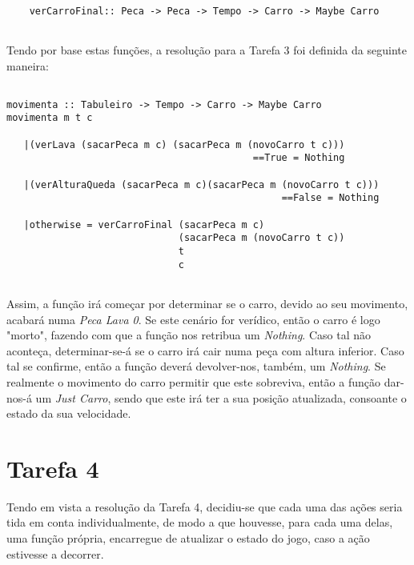 \documentclass[a4paper]{report} %
\begin{document}
  \begin{verbatim}
      
    verCarroFinal:: Peca -> Peca -> Tempo -> Carro -> Maybe Carro
    
  \end{verbatim}

  \par Tendo por base estas funções, a resolução para a Tarefa 3 foi definida da seguinte maneira:

  \begin{verbatim}
    
movimenta :: Tabuleiro -> Tempo -> Carro -> Maybe Carro
movimenta m t c 
   
   |(verLava (sacarPeca m c) (sacarPeca m (novoCarro t c)))
                                           ==True = Nothing 
   
   |(verAlturaQueda (sacarPeca m c)(sacarPeca m (novoCarro t c)))
                                                ==False = Nothing
   
   |otherwise = verCarroFinal (sacarPeca m c) 
                              (sacarPeca m (novoCarro t c)) 
                              t 
                              c 
	            
  \end{verbatim}

  \par Assim, a função irá começar por determinar se o carro, devido ao seu movimento, acabará numa \textit{Peca Lava 0}. Se este cenário for verídico, então o carro é logo "morto", fazendo com que a função nos retribua um \textit{Nothing}. Caso tal não aconteça, determinar-se-á se o carro irá cair numa peça com altura inferior. Caso tal se confirme, então a função deverá devolver-nos, também, um \textit{Nothing}. Se realmente o movimento do carro permitir que este sobreviva, então a função dar-nos-á um \textit{Just Carro}, sendo que este irá ter a sua posição atualizada, consoante o estado da sua velocidade.
  
  \section{Tarefa 4}
  
  \par \noindent Tendo em vista a resolução da Tarefa 4, decidiu-se que cada uma das ações seria tida em conta individualmente, de modo a que houvesse, para cada uma delas, uma função própria, encarregue de atualizar o estado do jogo, caso a ação estivesse a decorrer. 
  
\end{document}
